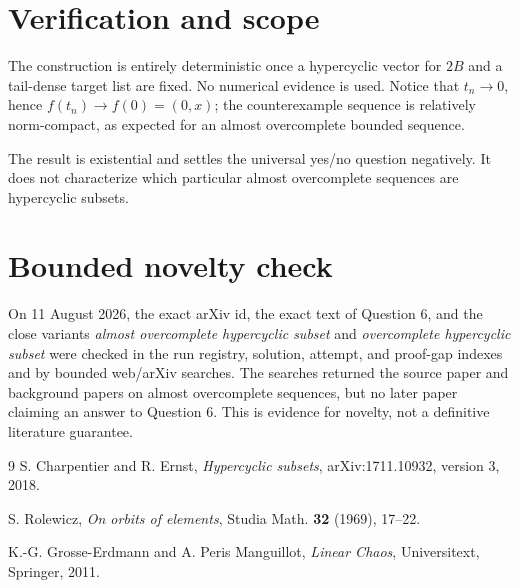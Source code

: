 \documentclass[11pt]{article}
\begin{document}
\section*{Verification and scope}
The construction is entirely deterministic once a hypercyclic vector for $2B$ and a tail-dense target list are fixed.  No numerical evidence is used.  Notice that $t_n\to0$, hence $f(t_n)\to f(0)=(0,x)$; the counterexample sequence is relatively norm-compact, as expected for an almost overcomplete bounded sequence.

The result is existential and settles the universal yes/no question negatively.  It does not characterize which particular almost overcomplete sequences are hypercyclic subsets.

\section*{Bounded novelty check}
On 11 August 2026, the exact arXiv id, the exact text of Question 6, and the close variants \emph{almost overcomplete hypercyclic subset} and \emph{overcomplete hypercyclic subset} were checked in the run registry, solution, attempt, and proof-gap indexes and by bounded web/arXiv searches.  The searches returned the source paper and background papers on almost overcomplete sequences, but no later paper claiming an answer to Question 6.  This is evidence for novelty, not a definitive literature guarantee.

\begin{thebibliography}{9}
S. Charpentier and R. Ernst,
\emph{Hypercyclic subsets}, arXiv:1711.10932, version 3, 2018.

S. Rolewicz,
\emph{On orbits of elements}, Studia Math. \textbf{32} (1969), 17--22.

K.-G. Grosse-Erdmann and A. Peris Manguillot,
\emph{Linear Chaos}, Universitext, Springer, 2011.
\end{thebibliography}
\end{document}

